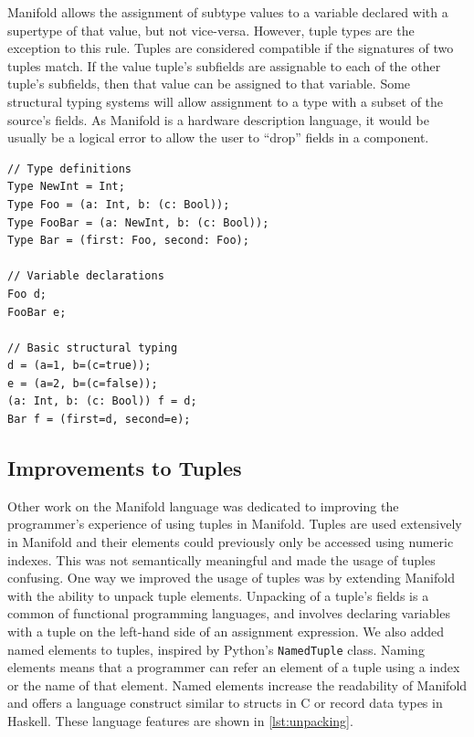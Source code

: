 Manifold allows the assignment of subtype values to a variable declared with a supertype of that value,
but not vice-versa.
However, tuple types are the exception to this rule. Tuples are
considered compatible if the signatures of two tuples
match. If the value tuple's subfields are assignable to each of the
other tuple's subfields, then that value can be assigned to that variable.
Some structural typing systems will allow assignment to a type with a subset of the source's fields.
As Manifold is a hardware description language, it would be usually be a logical error to allow
the user to ``drop'' fields in a component.

\begin{lstlisting}[label=lst:types,caption=Example of types in a Manifold file]
// Type definitions
Type NewInt = Int;
Type Foo = (a: Int, b: (c: Bool));
Type FooBar = (a: NewInt, b: (c: Bool));
Type Bar = (first: Foo, second: Foo);

// Variable declarations
Foo d;
FooBar e;

// Basic structural typing
d = (a=1, b=(c=true));
e = (a=2, b=(c=false));
(a: Int, b: (c: Bool)) f = d;
Bar f = (first=d, second=e);
\end{lstlisting}


\subsection{Improvements to Tuples}

Other work on the Manifold language was dedicated to improving the programmer's experience of using
tuples in Manifold. Tuples are used extensively in Manifold and their
elements could previously only be accessed using numeric indexes. This was not
semantically meaningful and made the usage of tuples confusing. One way we improved the usage of tuples
was by extending
Manifold with the ability to unpack tuple elements. Unpacking of a tuple's
fields is a common of functional programming languages, and involves declaring
variables with a tuple on the left-hand side of an assignment expression. We
also added named elements to tuples, inspired by Python's \texttt{NamedTuple}
class. Naming elements means that a programmer can refer an element of a tuple using a
index or the name of that element. Named elements increase the readability of
Manifold and offers a language construct similar to structs in C or record
data types in Haskell. These language features are shown in \autoref{lst:unpacking}.

